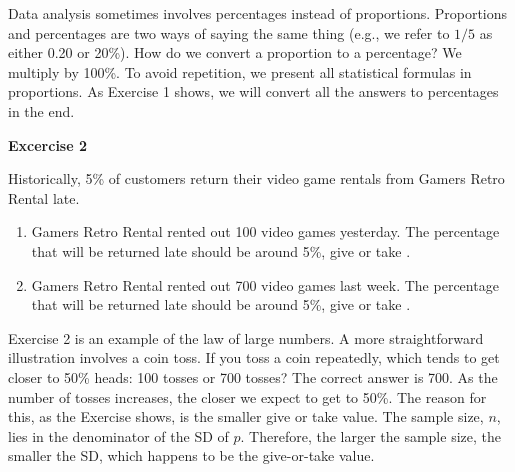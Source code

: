 \documentclass[11pt]{book}\usepackage[]{graphicx}\usepackage[]{color}
\begin{document}
Data analysis sometimes involves percentages instead of proportions.  Proportions and percentages are two ways of saying the same thing (e.g., we refer to $1/5$ as either 0.20 or 20\%).  How do we convert a proportion to a percentage?  We multiply by 100\%.  To avoid repetition, we present all statistical formulas in proportions.  As Exercise 1 shows, we will convert all the answers to percentages in the end.

\newpage

\begin{minipage}[ht]{29mm}

\vspace{-20mm}

\textbf{Excercise 2}

\end{minipage} \hfill
\begin{minipage}[ht]{109mm}

Historically, 5\% of customers return their video game rentals from Gamers Retro Rental late.

\begin{enumerate}
\item Gamers Retro Rental rented out 100 video games yesterday.  The percentage that will be returned late should be around 5\%, give or take \underline{\phantom{xxxxxxx}}.
\item Gamers Retro Rental rented out 700 video games last week.  The percentage that will be returned late should be around 5\%, give or take \underline{\phantom{xxxxxxx}}.
\end{enumerate}

\end{minipage}

Exercise 2 is an example of the law of large numbers.  A more straightforward illustration involves a coin toss.  If you toss a coin repeatedly, which tends to get closer to 50\% heads: 100 tosses or 700 tosses?  The correct answer is 700.  As the number of tosses increases, the closer we expect to get to 50\%.  The reason for this, as the Exercise shows, is the smaller give or take value.  The sample size, $n$, lies in the denominator of the SD of $\hat{p}$.  Therefore, the larger the sample size, the smaller the SD, which happens to be the give-or-take value.

\vspace{3mm}

\end{document}
